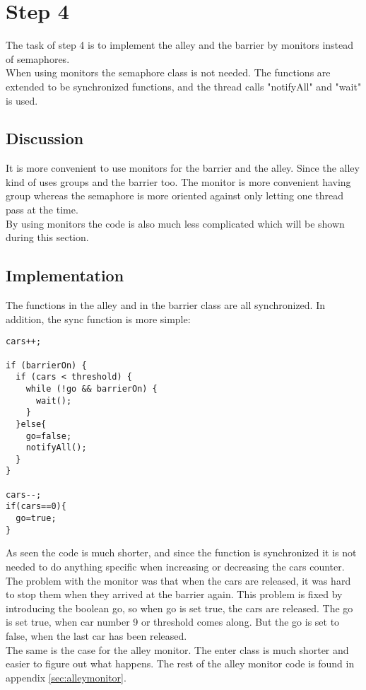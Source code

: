 \section{Step 4}
The task of step 4 is to implement the alley and the barrier by monitors instead of semaphores. \\
When using monitors the semaphore class is not needed. The functions are extended to be synchronized functions, and the thread calls "notifyAll" and "wait" is used.

\subsection{Discussion}
It is more convenient to use monitors for the barrier and the alley. Since the alley kind of uses groups and the barrier too. The monitor is more convenient having group whereas the semaphore is more oriented against only letting one thread pass at the time. \\
By using monitors the code is also much less complicated which will be shown during this section.

\subsection{Implementation}
The functions in the alley and in the barrier class are all synchronized. In addition, the sync function is more simple: 

\begin{lstlisting}
cars++;

if (barrierOn) {
  if (cars < threshold) {
    while (!go && barrierOn) {
      wait();	
    }
  }else{
    go=false;
    notifyAll();
  }
} 

cars--;
if(cars==0){
  go=true;
}
\end{lstlisting}
\vspace{.8cm}

As seen the code is much shorter, and since the function is synchronized it is not needed to do anything specific when increasing or decreasing the cars counter. The problem with the monitor was that when the cars are released, it was hard to stop them when they arrived at the barrier again. This problem is fixed by introducing the boolean go, so when go is set true, the cars are released. The go is set true, when car number 9 or threshold comes along. But the go is set to false, when 
the last car has been released. 
\\

The same is the case for the alley monitor. The enter class is much shorter and easier to figure out what happens. The rest of the alley monitor code is found in appendix \ref{sec:alleymonitor}. 